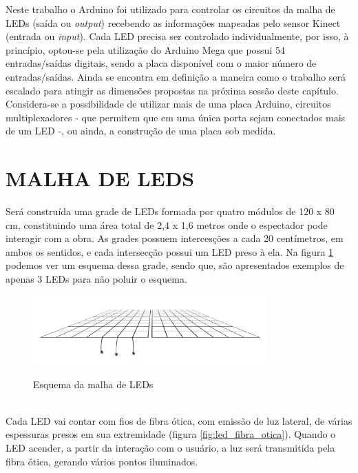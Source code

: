 Neste trabalho o Arduino foi utilizado para controlar os circuitos da malha de LEDs (saída ou \textit{output}) recebendo as informações mapeadas pelo sensor Kinect (entrada ou \textit{input}). Cada LED precisa ser controlado individualmente, por isso, à princípio, optou-se pela utilização do Arduino Mega que possui 54 entradas/saídas digitais, sendo a placa disponível com o maior número de entradas/saídas. Ainda se encontra em definição a maneira como o trabalho será escalado para atingir as dimensões propostas na próxima sessão deste capítulo. Considera-se a possibilidade de utilizar mais de uma placa Arduino, circuitos multiplexadores - que permitem que em uma única porta sejam conectados mais de um LED -, ou ainda, a construção de uma placa sob medida.

\section{MALHA DE LEDS}
\label{sec:malha}

Será construída uma grade de LEDs formada por quatro módulos de 120 x 80 cm, constituindo uma área total de 2,4 x 1,6 metros onde o espectador pode interagir com a obra. As grades possuem intercesções a cada 20 centímetros, em ambos os sentidos, e cada intersecção possui um LED preso à ela. Na figura \ref{fig:malha} podemos ver um esquema dessa grade, sendo que, são apresentados exemplos de apenas 3 LEDs para não poluir o esquema.

\begin{figure}[H]
    \centering
    \caption{Esquema da malha de LEDs}
	\vspace*{0,2cm}
    \includegraphics[width=0.8\textwidth]{./04-figuras/malha}
    \label{fig:malha}
\end{figure}
\vspace*{-0,9cm}
{\raggedright {}}\\

Cada LED vai contar com fios de fibra ótica, com emissão de luz lateral, de várias espessuras presos em sua extremidade (figura \ref{fig:led_fibra_otica}). Quando o LED acender, a partir da interação com o usuário, a luz será transmitida pela fibra ótica, gerando vários pontos iluminados.

